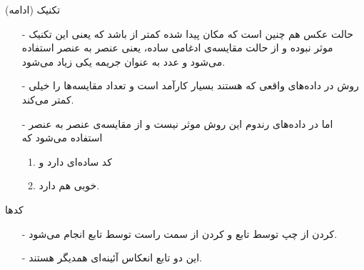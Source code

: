 \begin{frame}{تکنیک  (ادامه)}
\begin{itemize}\itemr
\item[-]
حالت عکس هم چنین است که مکان پیدا شده کمتر از 
باشد که یعنی این تکنیک موثر نبوده و از حالت مقایسه‌ی ادغامی ساده، یعنی عنصر به عنصر استفاده می‌شود و عدد
به عنوان جریمه یکی زیاد می‌شود.

\item[-]
روش  در داده‌های واقعی که  هستند بسیار کارآمد است و تعداد مقایسه‌ها را خیلی کمتر می‌کند.

\item[-]
اما در داده‌های رندوم این روش موثر نیست و از مقایسه‌ی عنصر به عنصر استفاده می‌شود که 
\begin{enumerate}\itemr
\item
کد ساده‌ای دارد و
\item
{}
 خوبی هم دارد.
\end{enumerate}
\end{itemize}
\end{frame}

\begin{frame}{کدها}
\begin{itemize}\itemr
\item[-]
کردن از چپ توسط تابع
و 
کردن از سمت راست توسط تابع
انجام می‌شود.

\item[-]
این دو تابع انعکاس آئینه‌ای همدیگر هستند.
\end{itemize}
\end{frame}